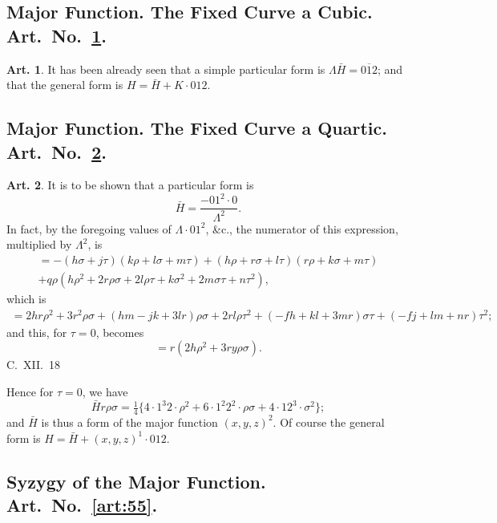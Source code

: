 \documentclass[12pt,a4paper]{article}
\theoremstyle{definition}
\newtheorem{art}{Art.}[section]
\begin{document}
\subsection*{Major Function. The Fixed Curve a Cubic. Art.~No.~\ref{art:53}.}

\begin{art}\label{art:53}
It has been already seen that a simple particular form is $\Lambda\bar{H} = \overline{012}$; and that the general form is $H = \bar{H} + K \cdot 012$.
\end{art}

\subsection*{Major Function. The Fixed Curve a Quartic. Art.~No.~\ref{art:54}.}

\begin{art}\label{art:54}
It is to be shown that a particular form is
\[
\bar{H} = \frac{-01^2 \cdot 0}{\Lambda^2}.
\]
In fact, by the foregoing values of $\Lambda \cdot 01^2$, \&c., the numerator of this expression, multiplied by $\Lambda^2$, is
\begin{multline*}
= -(h\sigma + j\tau)(k\rho + l\sigma + m\tau) + (h\rho + r\sigma + l\tau)(r\rho + k\sigma + m\tau) \\
+ q\rho(h\rho^2 + 2r\rho\sigma + 2l\rho\tau + k\sigma^2 + 2m\sigma\tau + n\tau^2),
\end{multline*}
which is
\begin{multline*}
= 2hr\rho^2 + 3r^2\rho\sigma + (hm - jk + 3lr)\rho\sigma + 2rl\rho\tau^2 + (-fh + kl + 3mr)\sigma\tau + (-fj + lm + nr)\tau^2;
\end{multline*}
and this, for $\tau = 0$, becomes
\[
= r(2h\rho^2 + 3ry\rho\sigma).
\]
C.~XII.~18
\end{art}

\newpage
Hence for $\tau = 0$, we have
\[
\bar{H}r\rho\sigma = \tfrac{1}{4}\{4 \cdot 1^3 2 \cdot \rho^2 + 6 \cdot 1^2 2^2 \cdot \rho\sigma + 4 \cdot 12^3 \cdot \sigma^2\};
\]
and $\bar{H}$ is thus a form of the major function $(x, y, z)^2$. Of course the general form is $H = \bar{H} + (x, y, z)^1 \cdot 012$.

\subsection*{Syzygy of the Major Function. Art.~No.~\ref{art:55}.}
\end{document}
